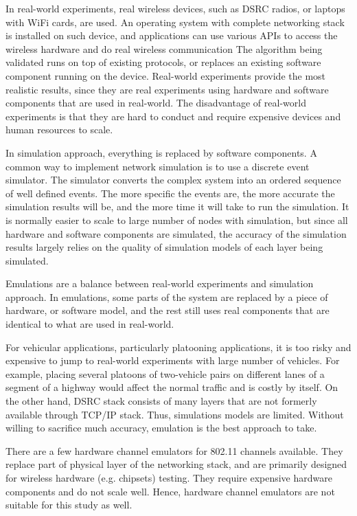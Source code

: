 \documentclass[12pt]{report}
\begin{document}
In real-world experiments, real wireless devices, such as DSRC radios, or laptops with WiFi cards, are used. An operating system with complete networking stack is installed on such device, and applications can use various APIs to access the wireless hardware and do real wireless communication The algorithm being validated runs on top of existing protocols, or replaces an existing software component running on the device. Real-world experiments provide the most realistic results, since they are real experiments using hardware and software components that are used in real-world. The disadvantage of real-world experiments is that they are hard to conduct and require expensive devices and human resources to scale.

In simulation approach, everything is replaced by software components. A common way to implement network simulation is to use a discrete event simulator. The simulator converts the complex system into an ordered sequence of well defined events. The more specific the events are, the more accurate the simulation results will be, and the more time it will take to run the simulation. It is normally easier to scale to large number of nodes with simulation, but since all hardware and software components are simulated, the accuracy of the simulation results largely relies on the quality of simulation models of each layer being simulated.

Emulations are a balance between real-world experiments and simulation approach. In emulations, some parts of the system are replaced by a piece of hardware, or software model, and the rest still uses real components that are identical to what are used in real-world.

For vehicular applications, particularly platooning applications, it is too risky and expensive to jump to real-world experiments with large number of vehicles. For example, placing several platoons of two-vehicle pairs on different lanes of a segment of a highway would affect the normal traffic and is costly by itself. On the other hand, DSRC stack consists of many layers that are not formerly available through TCP/IP stack. Thus, simulations models are limited. Without willing to sacrifice much accuracy, emulation is the best approach to take.

There are a few hardware channel emulators for 802.11 channels available. They replace part of physical layer of the networking stack, and are primarily designed for wireless hardware (e.g. chipsets) testing. They require expensive hardware components and do not scale well. Hence, hardware channel emulators are not suitable for this study as well.
\end{document}
